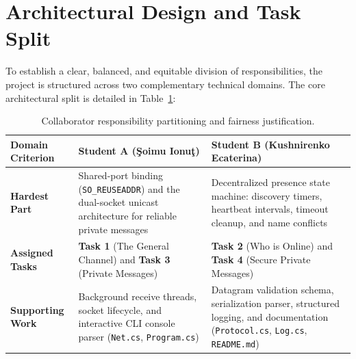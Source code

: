 \documentclass[11pt,a4paper]{article}
\begin{document}
\section{Architectural Design and Task Split}

To establish a clear, balanced, and equitable division of responsibilities, the project is structured across two complementary technical domains. The core architectural split is detailed in Table~\ref{tab:split}:

\begin{table}[H]
\centering
\small
\begin{tabularx}{\textwidth}{@{}>{\bfseries}p{3.2cm} >{\raggedright\arraybackslash}X >{\raggedright\arraybackslash}X@{}}
\toprule
Domain Criterion & Student A (\c{S}oimu Ionu\c{t}) & Student B (Kushnirenko Ecaterina) \\
\midrule
Hardest Part & Shared-port binding (\texttt{SO\_REUSEADDR}) and the dual-socket unicast architecture for reliable private messages & Decentralized presence state machine: discovery timers, heartbeat intervals, timeout cleanup, and name conflicts \\
Assigned Tasks & \textbf{Task 1} (The General Channel) and \textbf{Task 3} (Private Messages) & \textbf{Task 2} (Who is Online) and \textbf{Task 4} (Secure Private Messages) \\
Supporting Work & Background receive threads, socket lifecycle, and interactive CLI console parser (\texttt{Net.cs}, \texttt{Program.cs}) & Datagram validation schema, serialization parser, structured logging, and documentation (\texttt{Protocol.cs}, \texttt{Log.cs}, \texttt{README.md}) \\
\bottomrule
\end{tabularx}
\caption{Collaborator responsibility partitioning and fairness justification.}
\label{tab:split}
\end{table}
\end{document}

